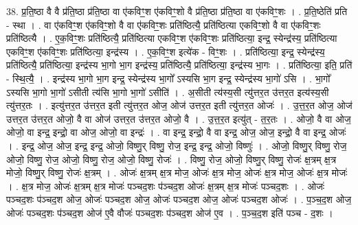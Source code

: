 \documentclass[17pt]{extarticle}
\begin{document}
38. प्र॒ति॒ष्ठा वै वै प्र॑ति॒ष्ठा प्र॑ति॒ष्ठा वा ए॑कविꣳ॒॒श ए॑कविꣳ॒॒शो वै प्र॑ति॒ष्ठा प्र॑ति॒ष्ठा वा ए॑कविꣳ॒॒शः । . प्र॒ति॒ष्ठेति॑ प्रति - स्था । . वा ए॑कविꣳ॒॒श ए॑कविꣳ॒॒शो वै वा ए॑कविꣳ॒॒शः प्रति॑ष्ठित्यै॒ प्रति॑ष्ठित्या एकविꣳ॒॒शो वै वा ए॑कविꣳ॒॒शः प्रति॑ष्ठित्यै । . ए॒क॒विꣳ॒॒शः प्रति॑ष्ठित्यै॒ प्रति॑ष्ठित्या एकविꣳ॒॒श ए॑कविꣳ॒॒शः प्रति॑ष्ठित्या॒ इन्द्र॒ स्येन्द्र॑स्य॒ प्रति॑ष्ठित्या एकविꣳ॒॒श ए॑कविꣳ॒॒शः प्रति॑ष्ठित्या॒ इन्द्र॑स्य । . ए॒क॒विꣳ॒॒श इत्ये॑क - विꣳ॒॒शः । . प्रति॑ष्ठित्या॒ इन्द्र॒ स्येन्द्र॑स्य॒ प्रति॑ष्ठित्यै॒ प्रति॑ष्ठित्या॒ इन्द्र॑स्य भा॒गो भा॒ग इन्द्र॑स्य॒ प्रति॑ष्ठित्यै॒ प्रति॑ष्ठित्या॒ इन्द्र॑स्य भा॒गः । . प्रति॑ष्ठित्या॒ इति॒ प्रति॑ - स्थि॒त्यै॒ । . इन्द्र॑स्य भा॒गो भा॒ग इन्द्र॒ स्येन्द्र॑स्य भा॒गो᳚ ऽस्यसि भा॒ग इन्द्र॒ स्येन्द्र॑स्य भा॒गो॑ ऽसि । . भा॒गो᳚ ऽस्यसि भा॒गो भा॒गो॑ ऽसीती त्य॑सि भा॒गो भा॒गो॑ ऽसीति॑ । . अ॒सीती त्य॑स्य॒सी त्यु॑त्तर॒त उ॑त्तर॒त इत्य॑स्य॒सी त्यु॑त्तर॒तः । . इत्यु॑त्तर॒त उ॑त्तर॒त इती त्यु॑त्तर॒त ओज॒ ओज॑ उत्तर॒त इती त्यु॑त्तर॒त ओजः॑ । . उ॒त्त॒र॒त ओज॒ ओज॑ उत्तर॒त उ॑त्तर॒त ओजो॒ वै वा ओज॑ उत्तर॒त उ॑त्तर॒त ओजो॒ वै । . उ॒त्त॒र॒त इत्यु॑त् - त॒र॒तः । . ओजो॒ वै वा ओज॒ ओजो॒ वा इन्द्र॒ इन्द्रो॒ वा ओज॒ ओजो॒ वा इन्द्रः॑ । . वा इन्द्र॒ इन्द्रो॒ वै वा इन्द्र॒ ओज॒ ओज॒ इन्द्रो॒ वै वा इन्द्र॒ ओजः॑ । . इन्द्र॒ ओज॒ ओज॒ इन्द्र॒ इन्द्र॒ ओजो॒ विष्णु॒र् विष्णु॒ रोज॒ इन्द्र॒ इन्द्र॒ ओजो॒ विष्णुः॑ । . ओजो॒ विष्णु॒र् विष्णु॒ रोज॒ ओजो॒ विष्णु॒ रोज॒ ओजो॒ विष्णु॒ रोज॒ ओजो॒ विष्णु॒ रोजः॑ । . विष्णु॒ रोज॒ ओजो॒ विष्णु॒र् विष्णु॒ रोजः॑ क्ष॒त्रम् क्ष॒त्र मोजो॒ विष्णु॒र् विष्णु॒ रोजः॑ क्ष॒त्रम् । . ओजः॑ क्ष॒त्रम् क्ष॒त्र मोज॒ ओजः॑ क्ष॒त्र मोज॒ ओजः॑ क्ष॒त्र मोज॒ ओजः॑ क्ष॒त्र मोजः॑ । . क्ष॒त्र मोज॒ ओजः॑ क्ष॒त्रम् क्ष॒त्र मोजः॑ पञ्चद॒शः प॑ञ्चद॒श ओजः॑ क्ष॒त्रम् क्ष॒त्र मोजः॑ पञ्चद॒शः । . ओजः॑ पञ्चद॒शः प॑ञ्चद॒श ओज॒ ओजः॑ पञ्चद॒श ओज॒ ओजः॑ पञ्चद॒श ओज॒ ओजः॑ पञ्चद॒श ओजः॑ । . प॒ञ्च॒द॒श ओज॒ ओजः॑ पञ्चद॒शः प॑ञ्चद॒श ओज॑ ए॒वै वौजः॑ पञ्चद॒शः प॑ञ्चद॒श ओज॑ ए॒व । . प॒ञ्च॒द॒श इति॑ पञ्च - द॒शः । \newline
\pagebreak
{}
\end{document}
